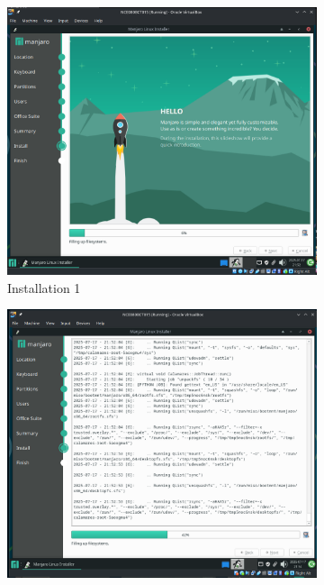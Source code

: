\documentclass[a4paper,12pt]{report}
\begin{document}
\begin{figure}[h]
    \centering
    \begin{subfigure}[b]{0.3\textwidth}
        \centering
        \includegraphics[width=\linewidth]{installation.png}
        \caption{Installation 1}
        \label{fig16}
    \end{subfigure}
    \hfill
    \begin{subfigure}[b]{0.3\textwidth}
        \centering
        \includegraphics[width=\linewidth]{installation2.png}

\end{subfigure}
\end{figure}
\end{document}
